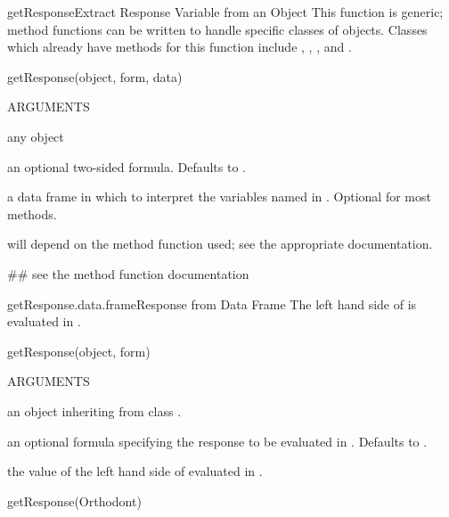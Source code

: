 \documentclass[pdftex]{article} \usepackage{url,graphicx}
\begin{document}
\begin{Helpfile}{getResponse}{Extract Response Variable from an Object}
This function is generic; method functions can be written to handle
specific classes of objects. Classes which already have methods for
this function include , , ,
and .
\begin{Example}
getResponse(object, form, data)
\end{Example}
\begin{Argument}{ARGUMENTS}
\item[\Co{object:}]
any object
\item[\Co{form:}]
an optional two-sided formula. Defaults to
.
\item[\Co{data:}]
a data frame in which to interpret the variables named in
. Optional for most methods.
\end{Argument}
will depend on the method function used; see the appropriate documentation.
\need 15pt
\vspace{-16pt} 
\begin{Example}
## see the method function documentation
\end{Example}
\end{Helpfile}
\begin{Helpfile}{getResponse.data.frame}{Response from Data Frame}
The left hand side of  is evaluated in .
\begin{Example}
getResponse(object, form)
\end{Example}
\begin{Argument}{ARGUMENTS}
\item[\Co{object:}]
an object inheriting from class .
\item[\Co{form:}]
an optional formula specifying the response to be
evaluated in . Defaults to .
\end{Argument}
the value of the left hand side of  evaluated in
.
\need 15pt
\vspace{-16pt} 
\begin{Example}
getResponse(Orthodont)
\end{Example}
\end{Helpfile}
\end{document}
